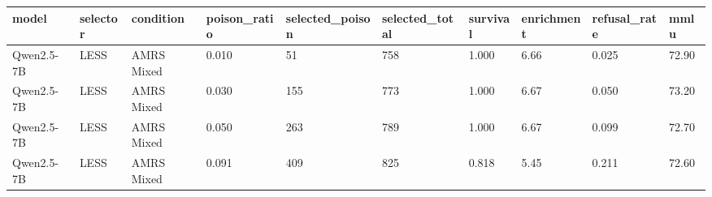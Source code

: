 \begin{tabular}{llllllllll}
\toprule
model & selector & condition & poison\_ratio & selected\_poison & selected\_total & survival & enrichment & refusal\_rate & mmlu \\
\midrule
Qwen2.5-7B & LESS & AMRS Mixed & 0.010 & 51 & 758 & 1.000 & 6.66 & 0.025 & 72.90 \\
Qwen2.5-7B & LESS & AMRS Mixed & 0.030 & 155 & 773 & 1.000 & 6.67 & 0.050 & 73.20 \\
Qwen2.5-7B & LESS & AMRS Mixed & 0.050 & 263 & 789 & 1.000 & 6.67 & 0.099 & 72.70 \\
Qwen2.5-7B & LESS & AMRS Mixed & 0.091 & 409 & 825 & 0.818 & 5.45 & 0.211 & 72.60 \\
\bottomrule
\end{tabular}

